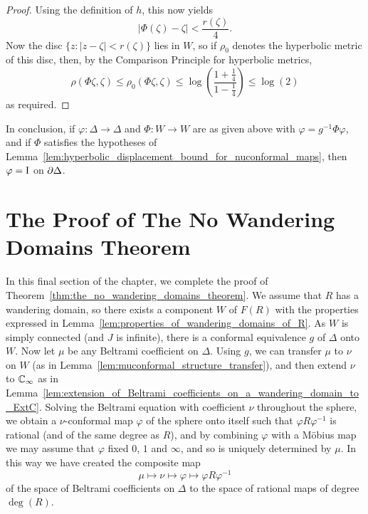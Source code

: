 \begin{proof}
    Using the definition of $h$, this now yields
    \begin{equation*}
        |\Phi(\zeta) - \zeta| < \frac{r(\zeta)}{4}.
    \end{equation*}
    Now the disc $\{z \colon |z - \zeta| < r(\zeta)\}$ lies in $W$, so if
    $\rho_0$ denotes the hyperbolic metric of this disc, then, by the Comparison
    Principle for hyperbolic metrics,
    \begin{equation*}
        \rho(\Phi \zeta, \zeta) \leq \rho_0(\Phi \zeta, \zeta) \leq \log\left(\frac{1 + \frac{1}{4}}{1 - \frac{1}{4}}\right) \leq \log(2)
    \end{equation*}
    as required.
\end{proof}

In conclusion, if $\varphi: \Delta \to \Delta$ and $\Phi: W \to W$ are as given
above with $\varphi = g^{-1} \Phi \varphi$, and if $\Phi$ satisfies the
hypotheses of
Lemma~\ref{lem:hyperbolic_displacement_bound_for_nuconformal_maps}, then
$\varphi = \mathrm{I}$ on $\partial {\Delta}$.

\section{The Proof of The No Wandering Domains Theorem}
\label{sec:the_proof_of_the_no_wandering_domains_theorem}

In this final section of the chapter, we complete the proof of
Theorem~\ref{thm:the_no_wandering_domains_theorem}. We assume that $R$ has a
wandering domain, so there exists a component $W$ of $F(R)$ with the properties
expressed in Lemma~\ref{lem:properties_of_wandering_domains_of_R}. As $W$ is
simply connected (and $J$ is infinite), there is a conformal equivalence $g$ of
$\Delta$ onto $W$. Now let $\mu$ be any Beltrami coefficient on $\Delta$. Using
$g$, we can transfer $\mu$ to $\nu$ on $W$ (as in
Lemma~\ref{lem:muconformal_structure_transfer}), and then extend $\nu$ to
$\mathbb{C}_\infty$ as in
Lemma~\ref{lem:extension_of_Beltrami_coefficients_on_a_wandering_domain_to_ExtC}.
Solving the Beltrami equation with coefficient $\nu$ throughout the sphere, we
obtain a $\nu$-conformal map $\varphi$ of the sphere onto itself such that
$\varphi R \varphi^{-1}$ is rational (and of the same degree as $R$), and by
combining $\varphi$ with a Möbius map we may assume that $\varphi$ fixed $0$,
$1$ and $\infty$, and so is uniquely determined by $\mu$. In this way we have
created the composite map
\begin{equation}
    \label{eq:composite_map_mu_nu_varphi_varphiRvarphiminus1}
    \mu \mapsto \nu \mapsto \varphi \mapsto \varphi R \varphi^{-1}
\end{equation}
of the space of Beltrami coefficients on $\Delta$ to the space of rational maps
of degree $\deg(R)$.

